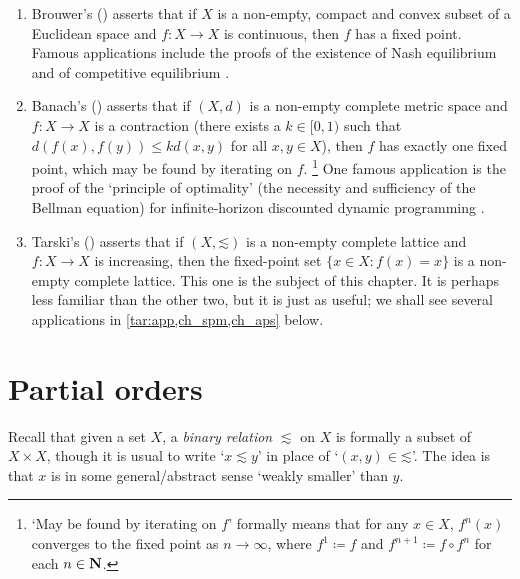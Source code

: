 \begin{enumerate}

	\item \label{item:fpt_browuer} Brouwer's (\citeyear{Brouwer1912}) asserts that if $X$ is a non-empty, compact and convex subset of a Euclidean space and $f : X \to X$ is continuous, then $f$ has a fixed point. Famous applications include the proofs of the existence of Nash equilibrium \parencite{Nash1950,Nash1951} and of competitive equilibrium \parencite{Mckenzie1954,Mckenzie1959,ArrowDebreu1954}.

	\item \label{item:fpt_banach} Banach's (\citeyear{Banach1922}) asserts that if $(X,d)$ is a non-empty complete metric space and $f : X \to X$ is a contraction (there exists a $k \in [0,1)$ such that $d(f(x),f(y)) \leq k d(x,y)$ for all $x,y \in X$), then $f$ has exactly one fixed point, which may be found by iterating on $f$.%
		\footnote{`May be found by iterating on $f$' formally means that for any $x \in X$, $f^n(x)$ converges to the fixed point as $n \to \infty$, where $f^1 \coloneqq f$ and $f^{n+1} \coloneqq f \circ f^n$ for each $n \in \mathbf{N}$.}
	One famous application is the proof of the `principle of optimality' (the necessity and sufficiency of the Bellman equation) for infinite-horizon discounted dynamic programming \parencite{Blackwell1965}.

	\item \label{item:fpt_tarski} Tarski's (\citeyear{Tarski1955}) asserts that if $(X,\mathord{\lesssim})$ is a non-empty complete lattice and $f : X \to X$ is increasing, then the fixed-point set $\{ x \in X : f(x) = x \}$ is a non-empty complete lattice. This one is the subject of this chapter. It is perhaps less familiar than the other two, but it is just as useful; we shall see several applications in \cref{tar:app,ch_spm,ch_aps} below.

\end{enumerate}



\section{Partial orders}
\label{tar:poset}

Recall that given a set $X$, a \emph{binary relation} $\lesssim$ on $X$ is formally a subset of $X \times X$, though it is usual to write `$x \lesssim y$' in place of `$(x,y) \in \mathord{\lesssim}$'. The idea is that $x$ is in some general/abstract sense `weakly smaller' than $y$.

